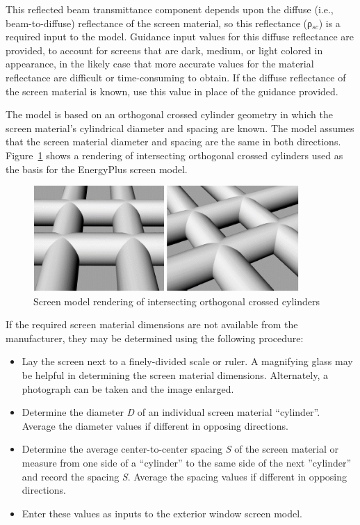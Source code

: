 This reflected beam transmittance component depends upon the diffuse (i.e., beam-to-diffuse) reflectance of the screen material, so this reflectance (ρ\(_{sc}\)) is a required input to the model. Guidance input values for this diffuse reflectance are provided, to account for screens that are dark, medium, or light colored in appearance, in the likely case that more accurate values for the material reflectance are difficult or time-consuming to obtain. If the diffuse reflectance of the screen material is known, use this value in place of the guidance provided.

The model is based on an orthogonal crossed cylinder geometry in which the screen material's cylindrical diameter and spacing are known. The model assumes that the screen material diameter and spacing are the same in both directions. Figure~\ref{fig:screen-model-rendering-of-intersecting} shows a rendering of intersecting orthogonal crossed cylinders used as the basis for the EnergyPlus screen model.

\begin{figure}[hbtp] %
\centering
\includegraphics[width=0.9\textwidth, height=0.9\textheight, keepaspectratio=true]{media/image1148.png}
\caption{Screen model rendering of intersecting orthogonal crossed cylinders \protect \label{fig:screen-model-rendering-of-intersecting}}
\end{figure}

If the required screen material dimensions are not available from the manufacturer, they may be determined using the following procedure:

\begin{itemize}
\item
  Lay the screen next to a finely-divided scale or ruler. A magnifying glass may be helpful in determining the screen material dimensions. Alternately, a photograph can be taken and the image enlarged.
\item
  Determine the diameter \emph{D} of an individual screen material ``cylinder''. Average the diameter values if different in opposing directions.
\item
  Determine the average center-to-center spacing \emph{S} of the screen material or measure from one side of a ``cylinder'' to the same side of the next ''cylinder'' and record the spacing \emph{S}. Average the spacing values if different in opposing directions.
\item
  Enter these values as inputs to the exterior window screen model.
\end{itemize}


